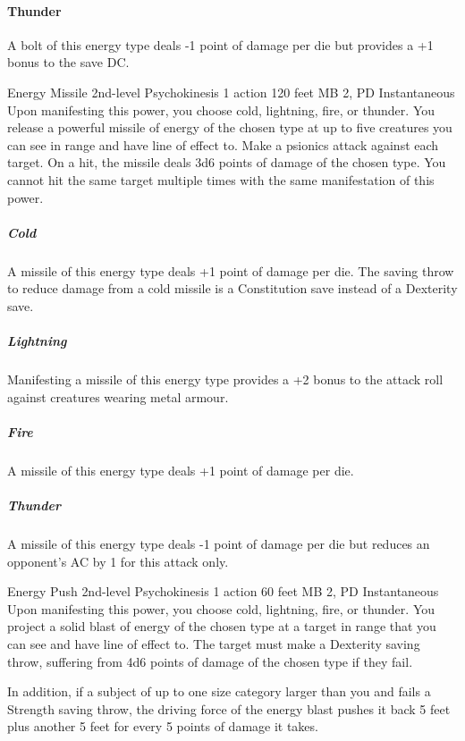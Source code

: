 \paragraph{Thunder}
A bolt of this energy type deals -1 point of damage per die
but provides a +1 bonus to the save DC.

\DndPowerHeader%
  {Energy Missile}
  {2nd-level Psychokinesis}
  {1 action}
  {120 feet}
  {MB 2, PD \lvltwo}
  {Instantaneous}
Upon manifesting this power,
you choose cold,
lightning,
fire,
or thunder.
You release a powerful missile of energy
of the chosen type at up to five creatures you can see in range
and have line of effect to.
Make a psionics attack against each target.
On a hit, the missile deals 3d6 points of damage of the chosen type.
You cannot hit the same target multiple times
with the same manifestation of this power.

\subparagraph{Cold}
A missile of this energy type deals +1 point of damage per die.
The saving throw to reduce damage from a cold missile
is a Constitution save instead of a Dexterity save.

\subparagraph{Lightning}
Manifesting a missile of this energy type provides
a +2 bonus to the attack roll against creatures wearing metal armour.

\subparagraph{Fire}
A missile of this energy type deals +1 point of damage per die.

\subparagraph{Thunder}
A missile of this energy type deals -1 point of damage per die
but reduces an opponent's AC by 1 for this attack only.

\DndPowerHeader%
  {Energy Push}
  {2nd-level Psychokinesis}
  {1 action}
  {60 feet}
  {MB 2, PD \lvltwo}
  {Instantaneous}
Upon manifesting this power, you choose cold, lightning, fire, or thunder.
You project a solid blast of energy of the chosen type at a target in range
that you can see and have line of effect to.
The target must make a Dexterity saving throw,
suffering from 4d6 points of damage of the chosen type if they fail.

In addition, if a subject of up to one size category larger than you
and fails a Strength saving throw,
the driving force of the energy blast pushes it back 5 feet
plus another 5 feet for every 5 points of damage it takes.

